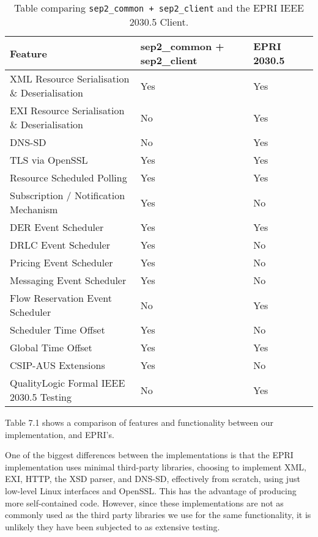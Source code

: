 \begin{table}[h]
	\centering
	\begin{tabular}{llll}
		\toprule
		\textbf{Feature} & \textbf{sep2\_common + sep2\_client} & \textbf{EPRI 2030.5}\\
		\midrule
		XML Resource Serialisation \& Deserialisation & Yes & Yes \\
		EXI Resource Serialisation \& Deserialisation & No  & Yes \\
		DNS-SD                                        & No  & Yes \\
		TLS via OpenSSL                               & Yes  & Yes \\
		Resource Scheduled Polling                    & Yes & Yes \\
		Subscription / Notification Mechanism         & Yes & No \\
		DER Event Scheduler                           & Yes & Yes \\
		DRLC Event Scheduler                          & Yes & No \\
		Pricing Event Scheduler                    	  & Yes & No \\
		Messaging Event Scheduler                     & Yes & No \\
		Flow Reservation Event Scheduler              & No  & Yes \\
		Scheduler Time Offset                         & Yes & No \\
		Global Time Offset                            & Yes & Yes \\
		CSIP-AUS Extensions                           & Yes & No \\
		QualityLogic Formal IEEE 2030.5 Testing       & No  & Yes \\
		\bottomrule
	\end{tabular}
	\caption{Table comparing \texttt{sep2\_common + sep2\_client} and the EPRI IEEE 2030.5 Client.}
	\label{tab:comparsiontable}
\end{table}

Table 7.1 shows a comparison of features and functionality between our implementation, and EPRI's.

One of the biggest differences between the implementations is that the EPRI implementation uses minimal third-party libraries, choosing to implement XML, EXI, HTTP, the XSD parser, and DNS-SD, effectively from scratch, using just low-level Linux interfaces and OpenSSL. This has the advantage of producing more self-contained code. However, since these implementations are not as commonly used as the third party libraries we use for the same functionality, it is unlikely they have been subjected to as extensive testing.

